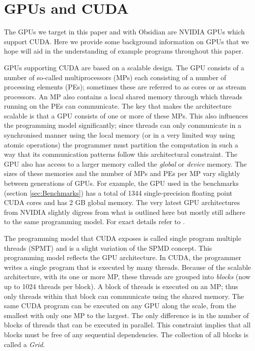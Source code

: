 \section{GPUs and CUDA} 

The GPUs we target in this paper and with Obsidian are NVIDIA GPUs which
support CUDA. Here we provide some background information on GPUs 
that we hope will aid in the understanding of example programs throughout this paper. 


GPUs supporting CUDA are based on a scalable design. The GPU consists of a 
number of so-called multiprocessors (MPs) each consisting of a number of 
processing elements (PEs); sometimes these are referred to as cores or as 
stream processors. An MP also contains a local shared memory through which 
threads running on the PEs can communicate. The key that 
makes the architecture scalable is that a GPU consists of one or more 
of these MPs. This also influences the programming model significantly; since
threads can only communicate in a synchronised manner using the local memory 
(or in a very limited way using atomic operations) the programmer must 
partition the computation in such a way that its communication patterns 
follow this architectural constraint. The GPU also has access to a larger 
memory called the {\em global} or {\em device} memory. The sizes of these 
memories and the number of MPs and PEs per MP vary slightly between 
generations of GPUs. For example, the GPU used in the benchmarks 
(section \ref{sec:Benchmarks}) has a total of 1344 single-precision floating
point CUDA cores and has 2 GB global memory. The very latest GPU architectures 
from NVIDIA slightly digress from what is outlined here but mostly still 
adhere to the same programming model. For exact details refer to \cite{KEPLER}.  

The programming model that CUDA exposes is called single program multiple 
threads (SPMT) and is a slight variation of the SPMD concept. This programming 
model reflects the GPU architecture. In CUDA, the programmer writes a single 
program that is executed by many threads. Because of the scalable architecture,
with its one or more MP, these threads are grouped into {\em blocks} 
(now up to 1024 threads per block). A block of threads is executed on an MP; 
thus only threads within that block can communicate using the shared memory. 
The same CUDA program can be executed on any GPU along the scale, from the 
smallest with only one MP to the largest. The only difference is in the number 
of blocks of threads that can be executed in parallel. This constraint implies 
that all blocks must be free of any sequential dependencies. The collection of 
all blocks is called a {\em Grid}.

